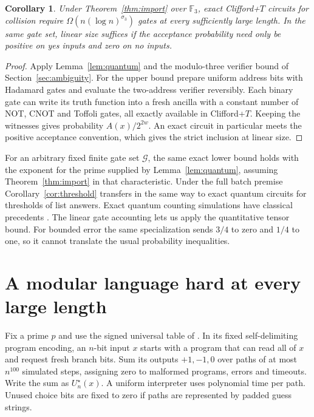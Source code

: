 \documentclass[11pt]{article}
\newtheorem{corollary}[theorem]{Corollary}
\theoremstyle{definition}
\theoremstyle{remark}
\newcommand{\F}{\mathbb{F}}
\begin{document}
\begin{corollary}
Under Theorem~\ref{thm:import} over $\F_3$, exact Clifford+$T$ circuits
for collision require $\Omega(n(\log n)^{\sigma_3})$ gates at every
sufficiently large length. In the same gate set, linear size suffices
if the acceptance probability need only be positive on yes inputs
and zero on no inputs.
\end{corollary}
\begin{proof}
Apply Lemma~\ref{lem:quantum} and the modulo-three verifier bound of
Section~\ref{sec:ambiguity}. For the upper bound prepare uniform address
bits with Hadamard gates and evaluate the two-address verifier reversibly.
Each binary gate can write its truth function into a fresh ancilla with
a constant number of NOT, CNOT and Toffoli gates, all exactly available
in Clifford+$T$. Keeping the witnesses gives probability
$A(x)/2^{2w}$. An exact circuit in particular meets the positive
acceptance convention, which gives the strict inclusion at linear size.
\end{proof}
For an arbitrary fixed finite gate set $\mathcal G$, the same exact
lower bound holds with the exponent for the prime supplied by
Lemma~\ref{lem:quantum}, assuming Theorem~\ref{thm:import} in that
characteristic.
Under the full batch premise Corollary~\ref{cor:threshold} transfers
in the same way to exact quantum circuits for thresholds of list answers.
Exact quantum counting simulations have classical precedents
\cite{FortnowRogers,deBeaudrap}. The linear gate accounting lets us
apply the quantitative tensor bound. For bounded error the same
specialization sends $3/4$ to zero and $1/4$ to one, so it cannot
translate the usual probability inequalities.

\section{A modular language hard at every large length}\label{sec:modular}
Fix a prime $p$ and use the signed universal table of \cite{HC}.
In its fixed self-delimiting program encoding, an $n$-bit input $x$
starts with a program that can read all of $x$ and request fresh
branch bits. Sum its outputs $+1,-1,0$ over paths of at most
$n^{100}$ simulated steps, assigning zero to malformed programs,
errors and timeouts. Write the sum as $U_n^\star(x)$. A uniform
interpreter uses polynomial time per path. Unused choice bits are
fixed to zero if paths are represented by padded guess strings.
\end{document}
